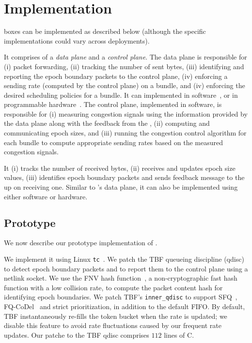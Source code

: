 \section{Implementation}\label{s:impl}
\name boxes can be implemented as described below (although the specific implementations could vary across deployments).

\Para{\capinbox} It comprises of a \emph{data plane} and a \emph{control plane}. The data plane is responsible for (i) packet forwarding, (ii) tracking the number of sent bytes, (iii) identifying and reporting the epoch boundary packets to the control plane, (iv) enforcing a sending rate (computed by the control plane) on a bundle, and (iv) enforcing the desired scheduling policies for a bundle. It can implemented in software~\cite{bess, click, netbricks, tc}, or in programmable
hardware~\cite{p4}. The control plane, implemented in software, is responsible for (i) measuring congestion signals using the information provided by the data plane along with the feedback from the \outbox, (ii) computing and communicating epoch sizes, and (iii) running the congestion control algorithm for each bundle to compute appropriate sending rates based on the measured congestion signals.

\Para{\capoutbox} It (i) tracks the number of received bytes, (ii) receives and updates epoch size values, (iii) identifies epoch boundary packets and sends feedback message to the \inbox up on receiving one. Similar to \inbox's data plane, it can also be implemented using either software or hardware.

\subsection{Prototype}\label{s:impl:prototype}

We now describe our prototype implementation of \name.

 We implement it using Linux \texttt{tc}~\cite{tc}.
We patch the TBF queueing discipline (qdisc)~\cite{tbf} to detect epoch boundary packets and to report them to the control plane using a netlink socket. 
We use the FNV hash function~\cite{fnv-hash}, a non-cryptographic fast hash function with a low collision rate, to compute the packet content hash for identifying epoch boundaries.
We patch TBF's \texttt{inner\_qdisc} to support SFQ~\cite{sfq}, FQ-CoDel~\cite{fq-codel} and strict prioritization, in addition to the default FIFO. 
By default, TBF instantaneously re-fills the token bucket when the rate is updated; we disable this feature to avoid rate fluctuations caused by our frequent rate updates. 
Our patche to the TBF qdisc comprises $112$ lines of C.

